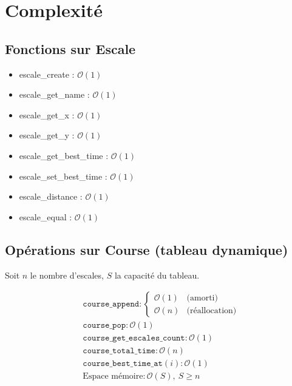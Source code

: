 \section{Complexité}\label{complexite}

\subsection{Fonctions sur Escale}

\begin{itemize}
    \item escale\_create : $\mathcal{O}(1)$
    \item escale\_get\_name : $\mathcal{O}(1)$
    \item escale\_get\_x : $\mathcal{O}(1)$
    \item escale\_get\_y : $\mathcal{O}(1)$
    \item escale\_get\_best\_time : $\mathcal{O}(1)$
    \item escale\_set\_best\_time : $\mathcal{O}(1)$
    \item escale\_distance : $\mathcal{O}(1)$
    \item escale\_equal : $\mathcal{O}(1)$
\end{itemize}

\subsection{Opérations sur Course (tableau dynamique)}
Soit $n$ le nombre d'escales, $S$ la capacité du tableau.

\begin{align*}
&\texttt{course\_append} :
    \begin{cases}
        \mathcal{O}(1) & \text{(amorti)} \\
        \mathcal{O}(n) & \text{(réallocation)}
    \end{cases} \\
&\texttt{course\_pop} : \mathcal{O}(1) \\
&\texttt{course\_get\_escales\_count} : \mathcal{O}(1) \\
&\texttt{course\_total\_time} : \mathcal{O}(n) \\
&\texttt{course\_best\_time\_at}(i) : \mathcal{O}(1) \\
&\text{Espace mémoire} : \mathcal{O}(S),\ S \geq n
\end{align*}

